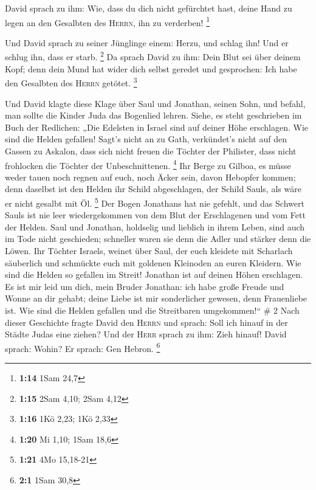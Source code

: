  David sprach zu ihm: Wie, dass du dich nicht gefürchtet
hast, deine Hand zu legen an den Gesalbten des \textsc{Herrn}, ihn zu
verderben! \footnote{\textbf{1:14} 1Sam 24,7}

 Und David sprach zu seiner Jünglinge einem: Herzu, und
schlag ihn! Und er schlug ihn, dass er starb. \footnote{\textbf{1:15}
  2Sam 4,10; 2Sam 4,12}  Da sprach David zu ihm: Dein
Blut sei über deinem Kopf; denn dein Mund hat wider dich selbst geredet
und gesprochen: Ich habe den Gesalbten des \textsc{Herrn} getötet.
\footnote{\textbf{1:16} 1Kö 2,23; 1Kö 2,33}

 Und David klagte diese Klage über Saul und Jonathan,
seinen Sohn,  und befahl, man sollte die Kinder Juda das
Bogenlied lehren. Siehe, es steht geschrieben im Buch der Redlichen:
 „Die Edelsten in Israel sind auf deiner Höhe erschlagen.
Wie sind die Helden gefallen!  Sagt's nicht an zu Gath,
verkündet's nicht auf den Gassen zu Askalon, dass sich nicht freuen die
Töchter der Philister, dass nicht frohlocken die Töchter der
Unbeschnittenen. \footnote{\textbf{1:20} Mi 1,10; 1Sam 18,6}
 Ihr Berge zu Gilboa, es müsse weder tauen noch regnen
auf euch, noch Äcker sein, davon Hebopfer kommen; denn daselbst ist den
Helden ihr Schild abgeschlagen, der Schild Sauls, als wäre er nicht
gesalbt mit Öl. \footnote{\textbf{1:21} 4Mo 15,18-21} 
Der Bogen Jonathans hat nie gefehlt, und das Schwert Sauls ist nie leer
wiedergekommen von dem Blut der Erschlagenen und vom Fett der Helden.
 Saul und Jonathan, holdselig und lieblich in ihrem
Leben, sind auch im Tode nicht geschieden; schneller waren sie denn die
Adler und stärker denn die Löwen.  Ihr Töchter Israels,
weinet über Saul, der euch kleidete mit Scharlach säuberlich und
schmückte euch mit goldenen Kleinoden an euren Kleidern. 
Wie sind die Helden so gefallen im Streit! Jonathan ist auf deinen Höhen
erschlagen.  Es ist mir leid um dich, mein Bruder
Jonathan: ich habe große Freude und Wonne an dir gehabt; deine Liebe ist
mir sonderlicher gewesen, denn Frauenliebe ist.  Wie sind
die Helden gefallen und die Streitbaren umgekommen!{}`` \# 2
 Nach dieser Geschichte fragte David den \textsc{Herrn}
und sprach: Soll ich hinauf in der Städte Judas eine ziehen? Und der
\textsc{Herr} sprach zu ihm: Zieh hinauf! David sprach: Wohin? Er
sprach: Gen Hebron. \footnote{\textbf{2:1} 1Sam 30,8}

